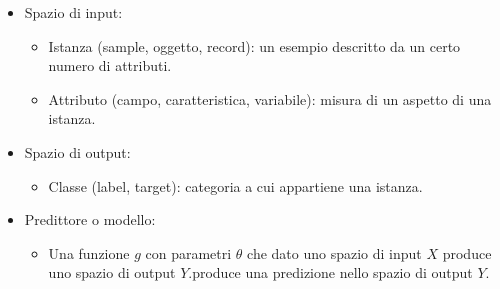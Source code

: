 \begin{itemize}
	\item Spazio di input:
	\begin{itemize}
		\item Istanza (sample, oggetto, record): un esempio descritto da un certo numero di attributi.
		\item Attributo (campo, caratteristica, variabile): misura di un aspetto di una istanza.
	
	\end{itemize}
	\item Spazio di output:
	\begin{itemize}
		\item Classe (label, target): categoria a cui appartiene una istanza.
	\end{itemize}
	\item Predittore o modello:
	\begin{itemize}
		\item Una funzione $g$ con parametri $\theta$ che dato uno spazio di input $X$ produce uno spazio di output $Y$.produce una predizione nello spazio di output $Y$.
	\end{itemize}
\end{itemize}

